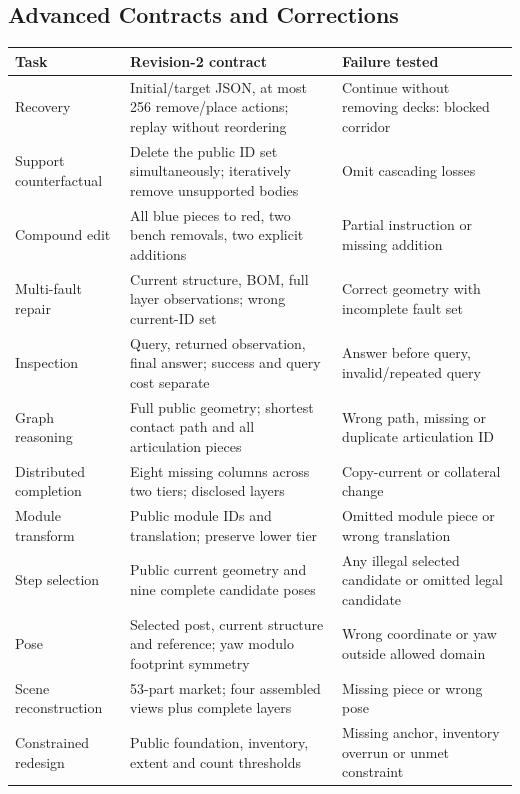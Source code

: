 \subsection{Advanced Contracts and Corrections}
\begin{tabularx}{\textwidth}{@{}lXX@{}}
\toprule
Task & Revision-2 contract & Failure tested\\
\midrule
Recovery & Initial/target JSON, at most 256 remove/place actions; replay without reordering & Continue without removing decks: blocked corridor\\
Support counterfactual & Delete the public ID set simultaneously; iteratively remove unsupported bodies & Omit cascading losses\\
Compound edit & All blue pieces to red, two bench removals, two explicit additions & Partial instruction or missing addition\\
Multi-fault repair & Current structure, BOM, full layer observations; wrong current-ID set & Correct geometry with incomplete fault set\\
Inspection & Query, returned observation, final answer; success and query cost separate & Answer before query, invalid/repeated query\\
Graph reasoning & Full public geometry; shortest contact path and all articulation pieces & Wrong path, missing or duplicate articulation ID\\
Distributed completion & Eight missing columns across two tiers; disclosed layers & Copy-current or collateral change\\
Module transform & Public module IDs and translation; preserve lower tier & Omitted module piece or wrong translation\\
Step selection & Public current geometry and nine complete candidate poses & Any illegal selected candidate or omitted legal candidate\\
Pose & Selected post, current structure and reference; yaw modulo footprint symmetry & Wrong coordinate or yaw outside allowed domain\\
Scene reconstruction & 53-part market; four assembled views plus complete layers & Missing piece or wrong pose\\
Constrained redesign & Public foundation, inventory, extent and count thresholds & Missing anchor, inventory overrun or unmet constraint\\
\bottomrule
\end{tabularx}

